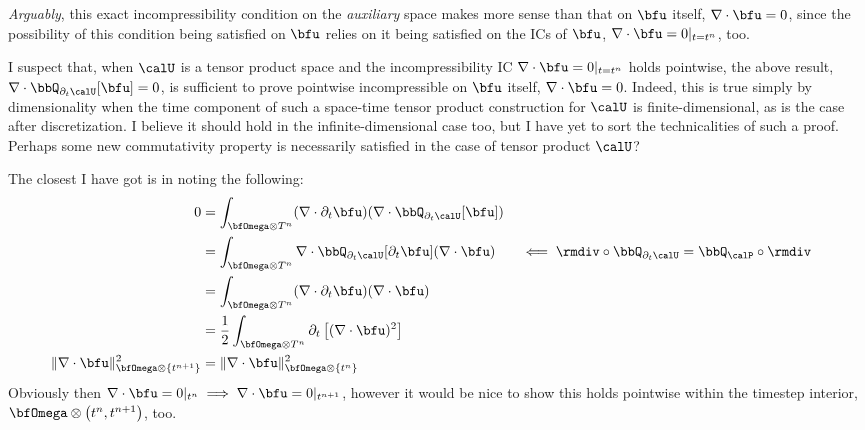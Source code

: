     \begin{remark}
        \emph{Arguably}, this exact incompressibility condition on the \emph{auxiliary} space makes more sense than that on $\bfu$ itself, $\nabla\cdot\bfu = 0$, since the possibility of this condition being satisfied on $\bfu$ relies on it being satisfied on the ICs of $\bfu$, $\nabla\cdot\bfu = 0|_{t = t^{n}}$, too.
        
        I suspect that, when $\calU$ is a tensor product space and the incompressibility IC $\nabla\cdot\bfu  =  0|_{t = t^{n}}$ holds pointwise, the above result, $\nabla\cdot\bbQ_{\partial_{t}\calU}[\bfu]  =  0$, is sufficient to prove pointwise incompressible on $\bfu$ itself, $\nabla\cdot\bfu = 0$. Indeed, this is true simply by dimensionality when the time component of such a space-time tensor product construction for $\calU$ is finite-dimensional, as is the case after discretization. I believe it should hold in the infinite-dimensional case too, but I have yet to sort the technicalities of such a proof. Perhaps some new commutativity property is necessarily satisfied in the case of tensor product $\calU$?

        The closest I have got is in noting the following:
        \begin{align}
            0  &=  \int_{\bfOmega\otimes T^{n}}(\nabla\cdot\partial_{t}\bfu)(\nabla\cdot\bbQ_{\partial_{t}\calU}[\bfu])  \\
            &=  \int_{\bfOmega\otimes T^{n}}\nabla\cdot\bbQ_{\partial_{t}\calU}[\partial_{t}\bfu](\nabla\cdot\bfu)  &&\impliedby  \rmdiv\circ\bbQ_{\partial_{t}\calU} = \bbQ_{\calP}\circ\rmdiv  \\
            &=  \int_{\bfOmega\otimes T^{n}}(\nabla\cdot\partial_{t}\bfu)(\nabla\cdot\bfu)  \\
            &=  \frac{1}{2}\int_{\bfOmega\otimes T^{n}}\partial_{t}\left[(\nabla\cdot\bfu)^{2}\right]  \\
            \|\nabla\cdot\bfu\|_{\bfOmega\otimes\left\{t^{n + 1}\right\}}^{2}  &=  
            \|\nabla\cdot\bfu\|_{\bfOmega\otimes\left\{t^{n}\right\}}^{2}
        \end{align}
        Obviously then $\nabla\cdot\bfu  =  0|_{t^{n}}  \implies  \nabla\cdot\bfu  =  0|_{t^{n + 1}}$, however it would be nice to show this holds pointwise within the timestep interior, $\bfOmega\otimes\left(t^{n}, t^{n + 1}\right)$, too.
    \end{remark}

    \line

